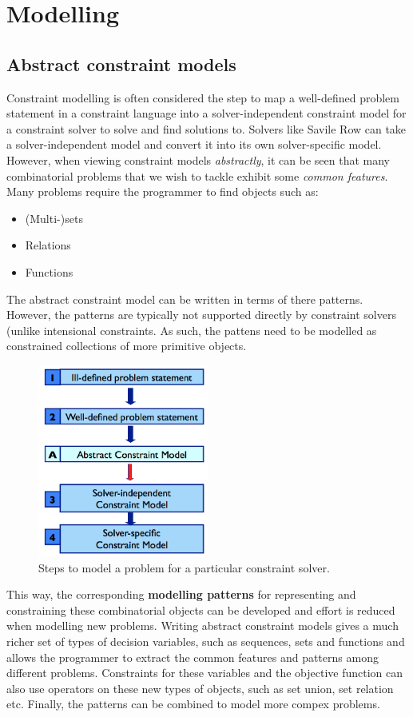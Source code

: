 \documentclass[CS4402-Notes.tex]{subfiles}
\begin{document}
\section{Modelling}

\subsection{Abstract constraint models}
Constraint modelling is often considered the step to map a well-defined problem statement in a constraint language into a solver-independent constraint model for a constraint solver to solve and find solutions to. Solvers like Savile Row can take a solver-independent model and convert it into its own solver-specific model. However, when viewing constraint models \textit{abstractly}, it can be seen that many combinatorial problems that we wish to tackle exhibit some \textit{common features}.
\n
Many problems require the programmer to find objects such as:
\begin{itemize}
\item (Multi-)sets
\item Relations
\item Functions
\end{itemize}
The abstract constraint model can be written in terms of there patterns. However, the patterns are typically not supported directly by constraint solvers (unlike intensional constraints. As such, the pattens need to be modelled as constrained collections of more primitive objects.
\begin{figure}[H]
\centering
\includegraphics[width=0.5\textwidth, keepaspectratio]{imgs/modelling-steps.png}
\caption{Steps to model a problem for a particular constraint solver.}
\end{figure}
\noindent
This way, the corresponding \textbf{modelling patterns} for representing and constraining these combinatorial objects can be developed and effort is reduced when modelling new problems. Writing abstract constraint models gives a much richer set of types of decision variables, such as sequences, sets and functions and allows the programmer to extract the common features and patterns among different problems. Constraints for these variables and the objective function can also use operators on these new types of objects, such as set union, set relation etc. Finally, the patterns can be combined to model more compex problems.
\end{document}
